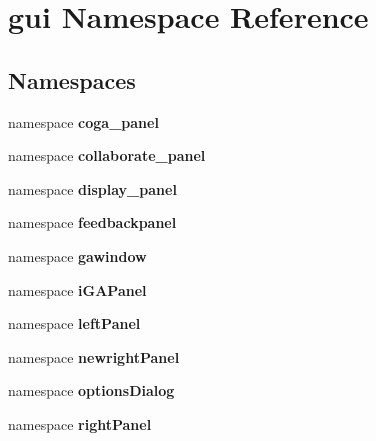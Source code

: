 \section{gui Namespace Reference}
\label{namespacegui}


\subsection*{Namespaces}
\begin{CompactItemize}
\item 
namespace {\bf coga\_\-panel}
\item 
namespace {\bf collaborate\_\-panel}
\item 
namespace {\bf display\_\-panel}
\item 
namespace {\bf feedbackpanel}
\item 
namespace {\bf gawindow}
\item 
namespace {\bf iGAPanel}
\item 
namespace {\bf leftPanel}
\item 
namespace {\bf newrightPanel}
\item 
namespace {\bf optionsDialog}
\item 
namespace {\bf rightPanel}
\end{CompactItemize}
